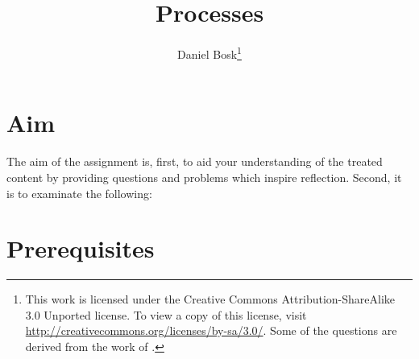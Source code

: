 \documentclass[a4paper,nocourse]{miunasgn}
\title{Processes}
\author{Daniel Bosk\footnote{%
	This work is licensed under the Creative Commons Attribution-ShareAlike 3.0 
	Unported license.
	To view a copy of this license, visit 
	\url{http://creativecommons.org/licenses/by-sa/3.0/}.
	Some of the questions are derived from the work of 
	\citeauthor*{Silberschatz2009osc}.
}}
\date{\svnId}
\begin{document}
\maketitle
\thispagestyle{foot}
\tableofcontents


\section{Aim}
\label{sec:Aim}
The aim of the assignment is, first, to aid your understanding of the treated 
content by providing questions and problems which inspire reflection.
Second, it is to examinate the following:
\begin{itemize}
	
\end{itemize}


\section{Prerequisites}
\label{sec:Prerequisites}

\end{document}
